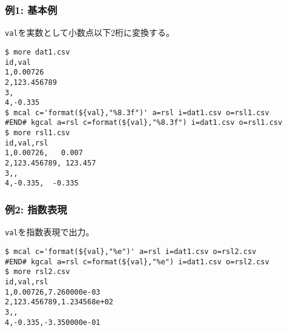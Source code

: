\subsubsection*{例1: 基本例}

\verb|val|を実数として小数点以下2桁に変換する。


\begin{Verbatim}[baselinestretch=0.7,frame=single]
$ more dat1.csv
id,val
1,0.00726
2,123.456789
3,
4,-0.335
$ mcal c='format(${val},"%8.3f")' a=rsl i=dat1.csv o=rsl1.csv
#END# kgcal a=rsl c=format(${val},"%8.3f") i=dat1.csv o=rsl1.csv
$ more rsl1.csv
id,val,rsl
1,0.00726,   0.007
2,123.456789, 123.457
3,,
4,-0.335,  -0.335
\end{Verbatim}
\subsubsection*{例2: 指数表現}

\verb|val|を指数表現で出力。


\begin{Verbatim}[baselinestretch=0.7,frame=single]
$ mcal c='format(${val},"%e")' a=rsl i=dat1.csv o=rsl2.csv
#END# kgcal a=rsl c=format(${val},"%e") i=dat1.csv o=rsl2.csv
$ more rsl2.csv
id,val,rsl
1,0.00726,7.260000e-03
2,123.456789,1.234568e+02
3,,
4,-0.335,-3.350000e-01
\end{Verbatim}
